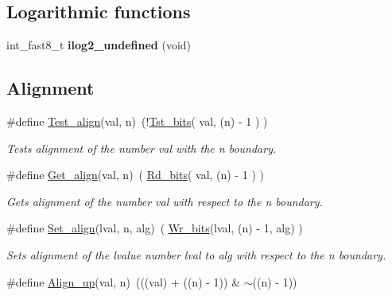 \subsection*{Logarithmic functions}
\begin{DoxyCompactItemize}
\item 
\hypertarget{group__group__xmega__utils_ga7285072905cc71554278e57710899699}{int\-\_\-fast8\-\_\-t {\bfseries ilog2\-\_\-undefined} (void)}\label{group__group__xmega__utils_ga7285072905cc71554278e57710899699}

\end{DoxyCompactItemize}
\subsection*{Alignment}
\begin{DoxyCompactItemize}
\item 
\#define \hyperlink{group__group__xmega__utils_gad490b657cb147d3d1773f6559559b98b}{Test\-\_\-align}(val, n)~(!\hyperlink{group__group__xmega__utils_gab1e92741077b101e6b2df74880e71e96}{Tst\-\_\-bits}( val, (n) -\/ 1     )   )
\begin{DoxyCompactList}\small\item\em Tests alignment of the number {\itshape val} with the {\itshape n} boundary. \end{DoxyCompactList}\item 
\#define \hyperlink{group__group__xmega__utils_ga526bddb313be14057f5d65e199f6d814}{Get\-\_\-align}(val, n)~(  \hyperlink{group__group__xmega__utils_ga53d9294b7065346ffa04d7991d2bc31e}{Rd\-\_\-bits}( val, (n) -\/ 1     )   )
\begin{DoxyCompactList}\small\item\em Gets alignment of the number {\itshape val} with respect to the {\itshape n} boundary. \end{DoxyCompactList}\item 
\#define \hyperlink{group__group__xmega__utils_gad607b0e4ad3cf4cb5bd7a3619742f092}{Set\-\_\-align}(lval, n, alg)~(  \hyperlink{group__group__xmega__utils_ga97b2bc0b5cdc7ec5293b7a5304cee0f0}{Wr\-\_\-bits}(lval, (n) -\/ 1, alg)   )
\begin{DoxyCompactList}\small\item\em Sets alignment of the lvalue number {\itshape lval} to {\itshape alg} with respect to the {\itshape n} boundary. \end{DoxyCompactList}\item 
\#define \hyperlink{group__group__xmega__utils_gab21656217d07b4ff1ecaabc63021feec}{Align\-\_\-up}(val, n)~(((val) + ((n) -\/ 1)) \& $\sim$((n) -\/ 1))

\end{DoxyCompactItemize}
